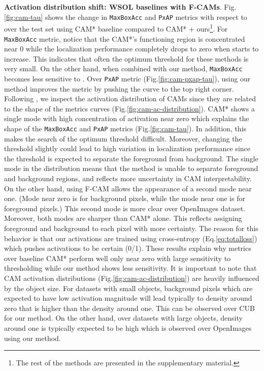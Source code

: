 \documentclass[twocolumn]{article}
\newcommand\maxboxacc{\texttt{MaxBoxAcc}\xspace}
\newcommand\pxap{\texttt{PxAP}\xspace}
\theoremstyle{definition}
\begin{document}
\noindent \textbf{Activation distribution shift: WSOL baselines with F-CAMs}. Fig.\ref{fig:cam-tau} shows the change in  \maxboxacc and \pxap metrics with respect to  over the test set using CAM* baseline compared to CAM* + ours\footnote{The rest of the methods are presented in the supplementary material.}. For \maxboxacc metric, notice that the CAM*'s functioning region is concentrated near 0 while the localization performance completely drops to zero when  starts to increase. This indicates that often the optimum threshold for these methods is very small. On the other hand, when combined with our method, \maxboxacc becomes less sensitive to . Over \pxap metric (Fig.\ref{fig:cam-pxap-tau}), using our method improves the metric by pushing the curve to the top right corner.
Following \cite{choe2020evaluating}, we inspect the activation distribution of CAMs since they are related to  the shape of the metrics curves (Fig.\ref{fig:cam-ac-distribution}). CAM* shows a single mode with high concentration of activation near zero which explains the shape of the \maxboxacc and \pxap metrics (Fig.\ref{fig:cam-tau}). In addition, this makes the search of the optimum threshold difficult. Moreover, changing the threshold slightly could lead to high variation in localization performance since the threshold is expected to separate the foreground from background. The single mode in the distribution means that the method is unable to separate foreground and background regions, and reflects more uncertainty in CAM interpretability. On the other hand, using F-CAM allows the appearance of a second mode near one. (Mode near zero is for background pixels, while the mode near one is for foreground pixels.) This second mode is more clear over OpenImages dataset. Moreover, both modes are sharper than CAM* alone. This reflects assigning foreground and background to each pixel with more certainty. The reason for this behavior is that our activations are trained using  cross-entropy (Eq.\ref{eq:totalloss}) which pushes activations to be certain (0/1). These results explain why metrics over baseline CAM* perform well only near zero with large sensitivity to thresholding while our method shows less sensitivity.
It is important to note that CAM activation distributions (Fig.\ref{fig:cam-ac-distribution}) are  heavily influenced by the object size. For datasets with small objects, background pixels which are expected to have low activation magnitude will lead typically to density around zero that is higher than the density around one. This can be observed over CUB for our method. On the other hand, over datasets with large objects, density around one is typically expected to be high which is observed over OpenImages using our method.
\end{document}
